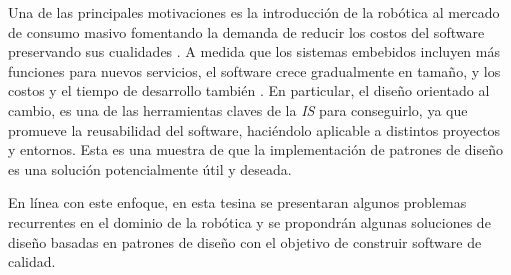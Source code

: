 Una de las principales motivaciones es la introducción de la robótica al mercado de consumo masivo fomentando la demanda de reducir los costos del software preservando sus cualidades \cite{Brugali2009}. A medida que los sistemas embebidos incluyen más funciones para nuevos servicios, el software crece gradualmente en tamaño, y los costos y el tiempo de desarrollo también \cite{model2}. En particular, el diseño orientado al cambio, es una de las herramientas claves de la \textit{IS} para conseguirlo, ya que promueve la reusabilidad del software, haciéndolo aplicable a distintos proyectos y entornos. Esta es una muestra de que la implementación de patrones de diseño es una solución potencialmente útil y deseada.

En línea con este enfoque, en esta tesina se presentaran algunos problemas recurrentes en el dominio de la robótica y se propondrán algunas soluciones de diseño basadas en patrones de diseño con el objetivo de construir software de calidad.

